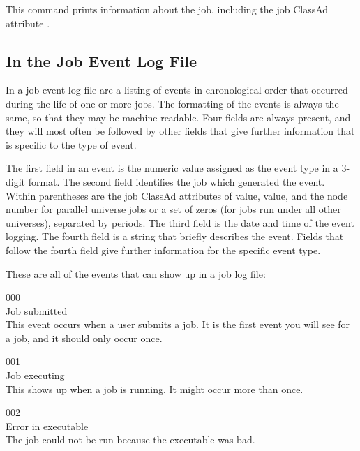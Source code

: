 This command prints information about the job, including 
the job ClassAd attribute .

\subsection{\label{sec:job-log-events}In the Job Event Log File}
In a job event log file are a listing of events in
chronological order that occurred during the life of one or more jobs.
The formatting of the events is always the same, 
so that they may be machine readable.
Four fields are always present,
and they will most often be followed by other fields that give further
information that is specific to the type of event.

The first field in an event is the numeric value assigned as the
event type in a 3-digit format.
The second field identifies the job which generated the event. 
Within parentheses are the job ClassAd attributes of
 value, 
 value, 
and the node number  for parallel universe jobs or a set of zeros
(for jobs run under all other universes),
separated by periods.
The third field is the date and time of the event logging.  
The fourth field is a string that briefly describes the event.
Fields that follow the fourth field give further information for the specific
event type.

These are all of the events that can show up in a job log file:

\noindent{} 000 \\
 Job submitted \\
 This event occurs when a user submits a job.
It is the first event you will see for a job, and it should only occur
once. 

\noindent{} 001 \\
 Job executing \\
 This shows up when a job is running.
It might occur more than once.

\noindent{} 002 \\
 Error in executable \\
 The job could not be run because the
executable was bad.

